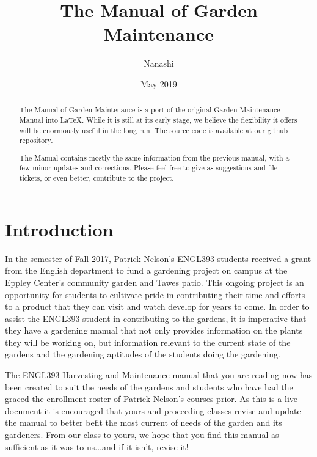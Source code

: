 \documentclass[12pt, oneside, a4paper]{memoir}
\title{The Manual of Garden Maintenance}
\author{Nanashi}
\date{May 2019}
\begin{document}
\frontmatter
\begin{titlingpage}
\maketitle

\end{titlingpage}

\begin{abstract}
\abstractintoc
    The Manual of Garden Maintenance is a port of the original Garden Maintenance Manual into \LaTeX. While it is still at its early stage, we believe the flexibility it offers will be enormously useful in the long run. The source code is available at our \href{https://github.com}{github repository}.
    
    The Manual contains mostly the same information from the previous manual, with a few minor updates and corrections. Please feel free to give as suggestions and file tickets, or even better, contribute to the project. 

    
\end{abstract}
\clearpage
\tableofcontents
\clearpage


\chapter{Introduction}
In the semester of Fall-2017, Patrick Nelson’s ENGL393 students received a grant from the English
department to fund a gardening project on campus at the Eppley Center’s community garden and
Tawes patio. This ongoing project is an opportunity for students to cultivate pride in contributing their
time and efforts to a product that they can visit and watch develop for years to come. In order to
assist the ENGL393 student in contributing to the gardens, it is imperative that they have a gardening
manual that not only provides information on the plants they will be working on, but information
relevant to the current state of the gardens and the gardening aptitudes of the students doing the
gardening.

The ENGL393 Harvesting and Maintenance manual that you are reading now has been created to
suit the needs of the gardens and students who have had the graced the enrollment roster of Patrick
Nelson’s courses prior. As this is a live document it is encouraged that yours and proceeding classes
revise and update the manual to better befit the most current of needs of the garden and its
gardeners. From our class to yours, we hope that you find this manual as sufficient as it was to
us...and if it isn’t, revise it!
\end{document}
